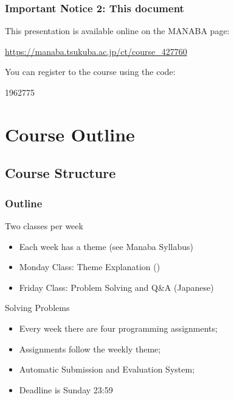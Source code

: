 \documentclass{beamer}
\begin{document}
\begin{frame}
  \frametitle{Important Notice 2: This document}

  This presentation is available online on the MANABA page: 

  \medskip

  \url{https://manaba.tsukuba.ac.jp/ct/course_427760}

  \medskip

  You can register to the course using the code:

  \medskip

  1962775


\end{frame}


\section{Course Outline}
\subsection{Course Structure}

\begin{frame}
    \frametitle{Outline}
    
    \begin{block}{Two classes per week}
        \begin{itemize}   
        \item Each week has a theme (see Manaba Syllabus)
        \item Monday Class: Theme Explanation ()
        \item Friday Class: Problem Solving and Q\&A (\alert{Japanese})
        \end{itemize}
    \end{block}
    
    \begin{block}{Solving Problems}
        \begin{itemize}
        \item Every week there are four programming assignments;
        \item Assignments follow the weekly theme;
        \item Automatic Submission and Evaluation System;
        \item Deadline is Sunday 23:59
        \end{itemize}   
    \end{block}
\end{frame}
    
\end{document}
